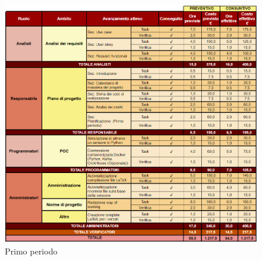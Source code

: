 \begin{figure}[H]
    \centering
    \includegraphics[height=1.0\textwidth]{../Images/periodo1.PNG}
    \caption{Primo periodo}
    \label{fig:Primo_periodo}
\end{figure}

